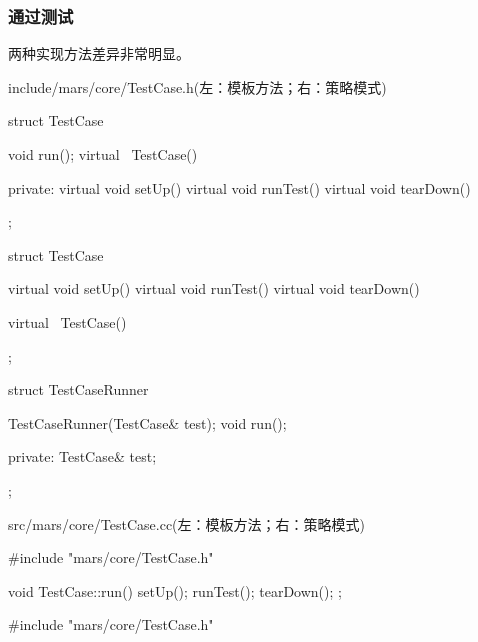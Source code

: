 \begin{content}
\subsubsection{通过测试}

两种实现方法差异非常明显。

\begin{enum}
\begin{enum}
\end{enum}
\begin{enum}
\end{enum}
\end{enum}

\begin{diff}{include/mars/core/TestCase.h(左：模板方法；右：策略模式)}
 \begin{minicpp}
struct TestCase {
  void run();  
  virtual ~TestCase() {}
  
private:
  virtual void setUp() {}
  virtual void runTest() {}
  virtual void tearDown() {}
};
\end{minicpp}
\tcblower
 \begin{minicpp}
struct TestCase {
  virtual void setUp() {}
  virtual void runTest() {}
  virtual void tearDown() {}

  virtual ~TestCase() {}
}; 

struct TestCaseRunner {
  TestCaseRunner(TestCase& test);
  void run();

private:
  TestCase& test;
};
\end{minicpp} 
\end{diff}

\begin{diff}{src/mars/core/TestCase.cc(左：模板方法；右：策略模式)}
 \begin{minicpp}
#include "mars/core/TestCase.h"

void TestCase::run() {
  setUp();
  runTest();
  tearDown();
};
\end{minicpp}
\tcblower
 \begin{minicpp}
#include "mars/core/TestCase.h"


\end{minicpp}
\end{diff}
\end{content}

